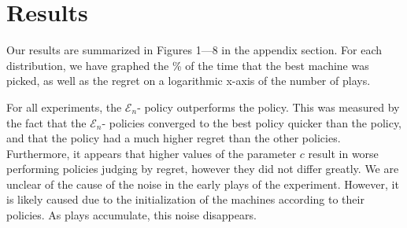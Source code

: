 
\section{Results}
\label{sec:results}

Our results are summarized in Figures 1---8 in the appendix
section. For each distribution, we have graphed the \% of the time that the
best machine was picked, as well as the regret on a logarithmic x-axis
of the number of plays.

For all experiments, the $\mathcal{E}_n$- policy
outperforms the  policy. This was measured by the fact
that the $\mathcal{E}_n$- policies converged to the
best policy quicker than the  policy, and that the
 policy had a much higher regret than the other
policies. Furthermore, it appears that higher values of the parameter
$c$ result in worse performing policies judging by regret, however
they did not differ greatly. We are unclear of the cause of the noise
in the early plays of the experiment. However, it is likely caused due
to the initialization of the machines according to their policies. As
plays accumulate, this noise disappears. 